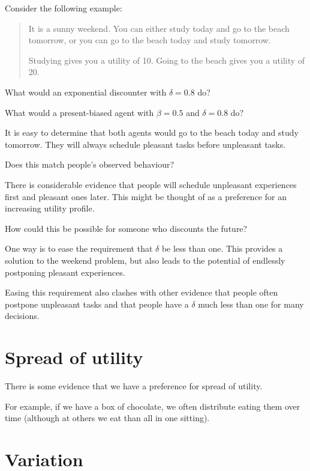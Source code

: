 \documentclass[
  letterpaper,
  DIV=11,
  numbers=noendperiod]{scrreprt}
\begin{document}
Consider the following example:

\begin{quote}
It is a sunny weekend. You can either study today and go to the beach
tomorrow, or you can go to the beach today and study tomorrow.

Studying gives you a utility of 10. Going to the beach gives you a
utility of 20.
\end{quote}

What would an exponential discounter with \(\delta=0.8\) do?

What would a present-biased agent with \(\beta=0.5\) and \(\delta=0.8\)
do?

It is easy to determine that both agents would go to the beach today and
study tomorrow. They will always schedule pleasant tasks before
unpleasant tasks.

Does this match people's observed behaviour?

There is considerable evidence that people will schedule unpleasant
experiences first and pleasant ones later. This might be thought of as a
preference for an increasing utility profile.

How could this be possible for someone who discounts the future?

One way is to ease the requirement that \(\delta\) be less than one.
This provides a solution to the weekend problem, but also leads to the
potential of endlessly postponing pleasant experiences.

Easing this requirement also clashes with other evidence that people
often postpone unpleasant tasks and that people have a \(\delta\) much
less than one for many decisions.

\hypertarget{spread-of-utility}{%
\section{Spread of utility}\label{spread-of-utility}}

There is some evidence that we have a preference for spread of utility.

For example, if we have a box of chocolate, we often distribute eating
them over time (although at others we eat than all in one sitting).

\hypertarget{variation}{%
\section{Variation}\label{variation}}
\end{document}
